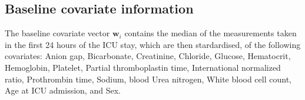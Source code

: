 \documentclass[
  10pt,
  a4paper,
]{article}
\begin{document}
\hypertarget{baseline-covariate-information}{%
\subsection{Baseline covariate
information}\label{baseline-covariate-information}}

The baseline covariate vector \(\boldsymbol{w}_{i}\) contains the median
of the measurements taken in the first 24 hours of the ICU stay, which
are then stardardised, of the following covariates: Anion gap,
Bicarbonate, Creatinine, Chloride, Glucose, Hematocrit, Hemoglobin,
Platelet, Partial thromboplastin time, International normalized ratio,
Prothrombin time, Sodium, blood Urea nitrogen, White blood cell count,
Age at ICU admission, and Sex.
\end{document}
